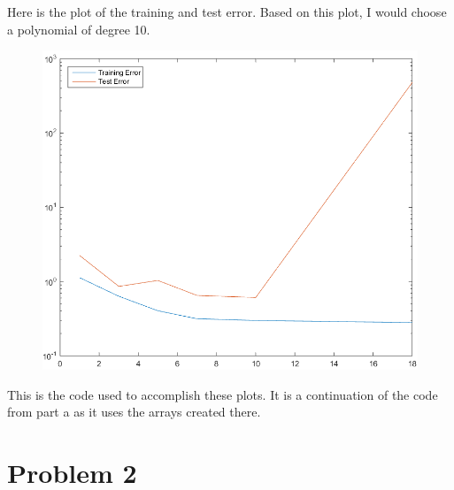 \documentclass[twoside,11pt]{article}
\theoremstyle{definition}
\begin{document}
\newpage

Here is the plot of the training and test error. Based on this plot, I would choose a polynomial of degree 10.
\begin{figure}[h]
\centering
\includegraphics[width=\columnwidth]{prob1cPlotB.png}
\end{figure}

\newpage
This is the code used to accomplish these plots. It is a continuation of the code from part a as it uses the arrays created there. 


\newpage

\section*{Problem 2}
\end{document}

